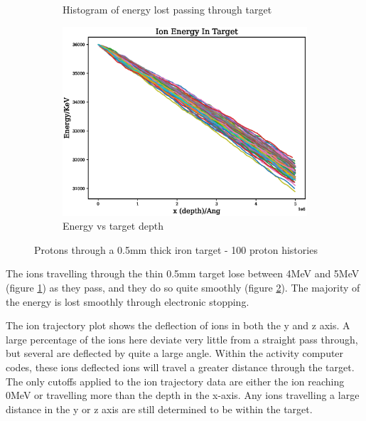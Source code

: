 \begin{figure}[htb]
\begin{subfigure}{0.49\textwidth}
  \caption{Histogram of energy lost passing through target}
  \label{fig:energylost1}
\end{subfigure}
\begin{subfigure}{0.49\textwidth}
  \includegraphics[width=\linewidth]{chapters/activity_code/images/energy_depth_500um.eps}
  \caption{Energy vs target depth}
  \label{fig:fe36mevenergydepth}
\end{subfigure}
\caption{Protons through a 0.5mm thick iron target - 100 proton histories}
\label{fig:xsdata-particle1}
\end{figure}

The ions travelling through the thin 0.5mm target lose between 4MeV and 5MeV (figure \ref{fig:energylost1}) as they pass, and they do so quite smoothly (figure \ref{fig:fe36mevenergydepth}).  The majority of the energy is lost smoothly through electronic stopping.  

The ion trajectory plot shows the deflection of ions in both the y and z axis.  A large percentage of the ions here deviate very little from a straight pass through, but several are deflected by quite a large angle.  Within the activity computer codes, these ions deflected ions will travel a greater distance through the target.  The only cutoffs applied to the ion trajectory data are either the ion reaching 0MeV or travelling more than the depth in the x-axis.  Any ions travelling a large distance in the y or z axis are still determined to be within the target.

